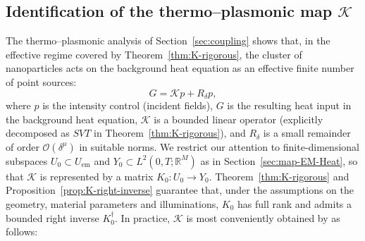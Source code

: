 \documentclass[11pt,a4paper]{article}
\numberwithin{equation}{section}
\theoremstyle{definition}
\newcommand{\R}{\mathbb{R}}
\newcommand{\1}{\mathbbm{1}}
\begin{document}
\subsection{Identification of the thermo--plasmonic map $\mathcal{K}$}
\label{subsec:alg-Ktp}
\noindent
The thermo--plasmonic analysis of Section~\ref{sec:coupling} shows that, in the effective
regime covered by Theorem~\ref{thm:K-rigorous}, the cluster of nanoparticles acts on the
background heat equation as an effective finite number of point sources:
\begin{equation}
\label{eq:alg-G-Ktp}
G = \mathcal{K} p + R_\delta p,
\end{equation}
where $p$ is the intensity control (incident fields), $G$ is the resulting heat
input in the background heat equation, $\mathcal{K}$ is a bounded linear
operator (explicitly decomposed as $SVT$ in Theorem~\ref{thm:K-rigorous}), and $R_\delta$ is
a small remainder of order $\mathcal{O}(\delta^\mu)$ in suitable norms.
\noindent
We restrict our attention to finite-dimensional subspaces
$U_0\subset U_{\mathrm{em}}$ and $Y_0\subset L^2(0,T;\R^M)$ as in
Section~\ref{sec:map-EM-Heat}, so that $\mathcal{K}$ is represented by a matrix
$K_0:U_0\to Y_0$. Theorem~\ref{thm:K-rigorous} and Proposition~\ref{prop:K-right-inverse} guarantee that, under the
assumptions on the geometry, material parameters and illuminations,
$K_0$ has full rank and admits a bounded right inverse $K_0^\dagger$.
\noindent
In practice, $\mathcal{K}$ is most conveniently obtained by as follows:
\end{document}
